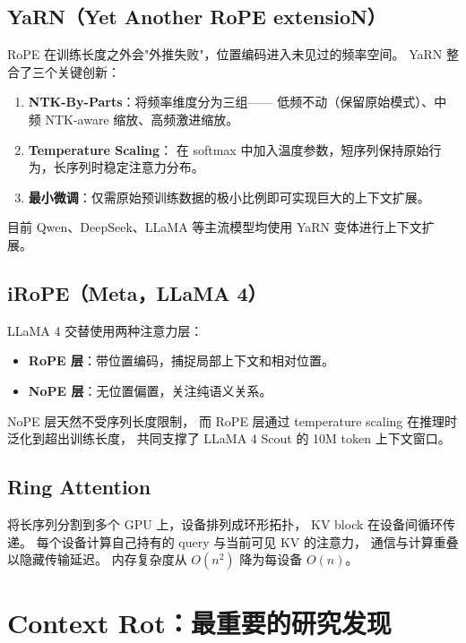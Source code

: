 \documentclass[
  customlatinfont = macos,
]{hkustthesis}
\begin{document}
\subsection{YaRN（Yet Another RoPE extensioN）}

RoPE 在训练长度之外会"外推失败"，位置编码进入未见过的频率空间。
YaRN 整合了三个关键创新：

\begin{enumerate}[noitemsep]
  \item \textbf{NTK-By-Parts}：将频率维度分为三组——
        低频不动（保留原始模式）、中频 NTK-aware 缩放、高频激进缩放。
  \item \textbf{Temperature Scaling}：
        在 softmax 中加入温度参数，短序列保持原始行为，长序列时稳定注意力分布。
  \item \textbf{最小微调}：仅需原始预训练数据的极小比例即可实现巨大的上下文扩展。
\end{enumerate}

目前 Qwen、DeepSeek、LLaMA 等主流模型均使用 YaRN 变体进行上下文扩展。

\subsection{iRoPE（Meta，LLaMA 4）}

LLaMA 4 交替使用两种注意力层：
\begin{itemize}[noitemsep]
  \item \textbf{RoPE 层}：带位置编码，捕捉局部上下文和相对位置。
  \item \textbf{NoPE 层}：无位置偏置，关注纯语义关系。
\end{itemize}

NoPE 层天然不受序列长度限制，
而 RoPE 层通过 temperature scaling 在推理时泛化到超出训练长度，
共同支撑了 LLaMA 4 Scout 的 10M token 上下文窗口。

\subsection{Ring Attention}

将长序列分割到多个 GPU 上，设备排列成环形拓扑，
KV block 在设备间循环传递。
每个设备计算自己持有的 query 与当前可见 KV 的注意力，
通信与计算重叠以隐藏传输延迟。
内存复杂度从 $O(n^2)$ 降为每设备 $O(n)$。

\section{Context Rot：最重要的研究发现}
\end{document}
